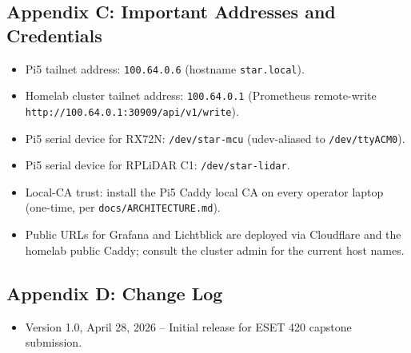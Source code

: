 \documentclass[11pt,letterpaper]{article}
\begin{document}
\subsection*{Appendix C: Important Addresses and Credentials}

\begin{itemize}[leftmargin=1.4em,itemsep=2pt]
\item Pi5 tailnet address: \texttt{100.64.0.6}
      (hostname \texttt{star.local}).
\item Homelab cluster tailnet address: \texttt{100.64.0.1}
      (Prometheus remote-write
      \texttt{http://100.64.0.1:30909/api/v1/write}).
\item Pi5 serial device for RX72N: \texttt{/dev/star-mcu}
      (udev-aliased to \texttt{/dev/ttyACM0}).
\item Pi5 serial device for RPLiDAR C1: \texttt{/dev/star-lidar}.
\item Local-CA trust: install the Pi5 Caddy local CA on every
      operator laptop (one-time, per \texttt{docs/ARCHITECTURE.md}).
\item Public URLs for Grafana and Lichtblick are deployed via
      Cloudflare and the homelab public Caddy; consult the cluster
      admin for the current host names.
\end{itemize}

\subsection*{Appendix D: Change Log}

\begin{itemize}[leftmargin=1.4em,itemsep=2pt]
\item Version 1.0, April 28, 2026 -- Initial release for ESET 420
      capstone submission.
\end{itemize}
\end{document}
